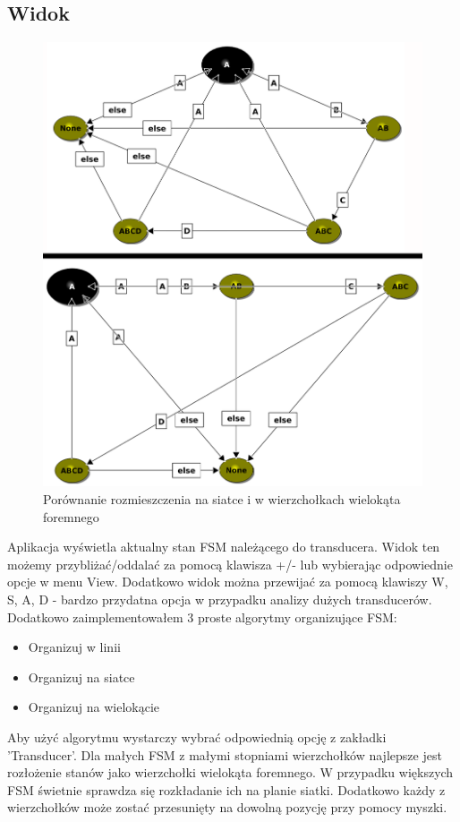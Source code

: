 \documentclass[declaration,shortabstract]{iithesis}
\theoremstyle{definition}
\theoremstyle{plain}
\begin{document}
\subsection{Widok}
\begin{figure}[h]
\centering
\includegraphics[width=\textwidth]{comp.png}
\caption{Porównanie rozmieszczenia na siatce i w wierzchołkach wielokąta foremnego}
\label{fig:comp}
\end{figure}
Aplikacja wyświetla aktualny stan FSM należącego do transducera. Widok ten możemy przybliżać/oddalać za pomocą klawisza +/- lub wybierając odpowiednie opcje w menu View. Dodatkowo widok można przewijać za pomocą klawiszy W, S, A, D - bardzo przydatna opcja w przypadku analizy dużych transducerów.\\
Dodatkowo zaimplementowałem 3 proste algorytmy organizujące FSM:
\begin{itemize}
\item Organizuj w linii
\item Organizuj na siatce
\item Organizuj na wielokącie
\end{itemize}
Aby użyć algorytmu wystarczy wybrać odpowiednią opcję z zakładki 'Transducer'. Dla małych FSM z małymi stopniami wierzchołków najlepsze jest rozłożenie stanów jako wierzchołki wielokąta foremnego. W przypadku większych FSM świetnie sprawdza się rozkładanie ich na planie siatki. Dodatkowo każdy z wierzchołków może zostać przesunięty na dowolną pozycję przy pomocy myszki.
\end{document}
